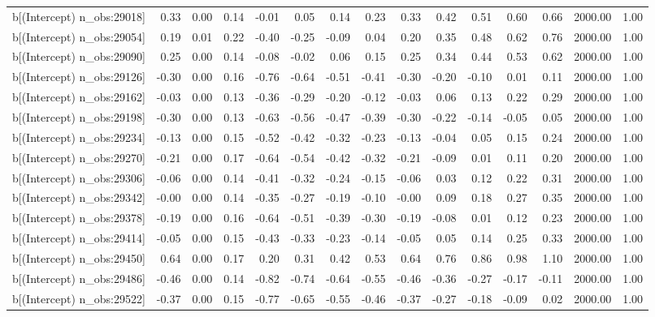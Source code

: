 \begin{table}[ht]
\begin{tabular}{rrrrrrrrrrrrrrr}
  b[(Intercept) n\_obs:29018] & 0.33 & 0.00 & 0.14 & -0.01 & 0.05 & 0.14 & 0.23 & 0.33 & 0.42 & 0.51 & 0.60 & 0.66 & 2000.00 & 1.00 \\ 
  b[(Intercept) n\_obs:29054] & 0.19 & 0.01 & 0.22 & -0.40 & -0.25 & -0.09 & 0.04 & 0.20 & 0.35 & 0.48 & 0.62 & 0.76 & 2000.00 & 1.00 \\ 
  b[(Intercept) n\_obs:29090] & 0.25 & 0.00 & 0.14 & -0.08 & -0.02 & 0.06 & 0.15 & 0.25 & 0.34 & 0.44 & 0.53 & 0.62 & 2000.00 & 1.00 \\ 
  b[(Intercept) n\_obs:29126] & -0.30 & 0.00 & 0.16 & -0.76 & -0.64 & -0.51 & -0.41 & -0.30 & -0.20 & -0.10 & 0.01 & 0.11 & 2000.00 & 1.00 \\ 
  b[(Intercept) n\_obs:29162] & -0.03 & 0.00 & 0.13 & -0.36 & -0.29 & -0.20 & -0.12 & -0.03 & 0.06 & 0.13 & 0.22 & 0.29 & 2000.00 & 1.00 \\ 
  b[(Intercept) n\_obs:29198] & -0.30 & 0.00 & 0.13 & -0.63 & -0.56 & -0.47 & -0.39 & -0.30 & -0.22 & -0.14 & -0.05 & 0.05 & 2000.00 & 1.00 \\ 
  b[(Intercept) n\_obs:29234] & -0.13 & 0.00 & 0.15 & -0.52 & -0.42 & -0.32 & -0.23 & -0.13 & -0.04 & 0.05 & 0.15 & 0.24 & 2000.00 & 1.00 \\ 
  b[(Intercept) n\_obs:29270] & -0.21 & 0.00 & 0.17 & -0.64 & -0.54 & -0.42 & -0.32 & -0.21 & -0.09 & 0.01 & 0.11 & 0.20 & 2000.00 & 1.00 \\ 
  b[(Intercept) n\_obs:29306] & -0.06 & 0.00 & 0.14 & -0.41 & -0.32 & -0.24 & -0.15 & -0.06 & 0.03 & 0.12 & 0.22 & 0.31 & 2000.00 & 1.00 \\ 
  b[(Intercept) n\_obs:29342] & -0.00 & 0.00 & 0.14 & -0.35 & -0.27 & -0.19 & -0.10 & -0.00 & 0.09 & 0.18 & 0.27 & 0.35 & 2000.00 & 1.00 \\ 
  b[(Intercept) n\_obs:29378] & -0.19 & 0.00 & 0.16 & -0.64 & -0.51 & -0.39 & -0.30 & -0.19 & -0.08 & 0.01 & 0.12 & 0.23 & 2000.00 & 1.00 \\ 
  b[(Intercept) n\_obs:29414] & -0.05 & 0.00 & 0.15 & -0.43 & -0.33 & -0.23 & -0.14 & -0.05 & 0.05 & 0.14 & 0.25 & 0.33 & 2000.00 & 1.00 \\ 
  b[(Intercept) n\_obs:29450] & 0.64 & 0.00 & 0.17 & 0.20 & 0.31 & 0.42 & 0.53 & 0.64 & 0.76 & 0.86 & 0.98 & 1.10 & 2000.00 & 1.00 \\ 
  b[(Intercept) n\_obs:29486] & -0.46 & 0.00 & 0.14 & -0.82 & -0.74 & -0.64 & -0.55 & -0.46 & -0.36 & -0.27 & -0.17 & -0.11 & 2000.00 & 1.00 \\ 
  b[(Intercept) n\_obs:29522] & -0.37 & 0.00 & 0.15 & -0.77 & -0.65 & -0.55 & -0.46 & -0.37 & -0.27 & -0.18 & -0.09 & 0.02 & 2000.00 & 1.00 \\ 

\end{tabular}
\end{table}
